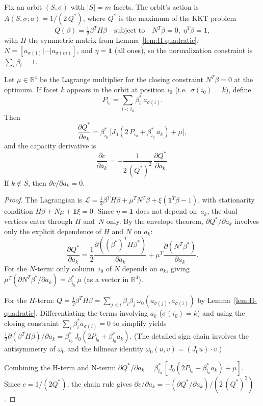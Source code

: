 \begin{unverified}
\begin{lemma}
\label{lem:cap-derivative}
Fix an orbit $(S,\sigma)$ with $|S| = m$ facets. The orbit's action is
$A(S,\sigma;a) = 1/(2\,Q^*)$, where $Q^*$ is the maximum of the KKT problem
\[
  Q(\beta) = \tfrac{1}{2}\beta^T H \beta
  \quad\text{subject to}\quad
  N^T\beta = 0,\; \eta^T\beta = 1,
\]
with $H$ the symmetric matrix from Lemma~\ref{lem:H-quadratic},
$N = [a_{\sigma(1)} | \cdots | a_{\sigma(m)}]$, and
$\eta = \mathbf{1}$ (all ones), so the normalization constraint is
$\sum_i \beta_i = 1$.

Let $\mu \in \mathbb{R}^4$ be the Lagrange multiplier for the closing
constraint $N^T\beta = 0$ at the optimum. If facet $k$ appears in the
orbit at position $i_0$ (i.e.\ $\sigma(i_0) = k$), define
\[
  P_{i_0} = \sum_{i < i_0} \beta_i^*\,a_{\sigma(i)}.
\]
Then
\[
  \frac{\partial Q^*}{\partial a_k}
  = \beta_{i_0}^*\,\bigl[J_0(2\,P_{i_0} + \beta_{i_0}^*\,a_k) + \mu\bigr],
\]
and the capacity derivative is
\[
  \frac{\partial c}{\partial a_k}
  = -\frac{1}{2\,(Q^*)^2}\,\frac{\partial Q^*}{\partial a_k}.
\]
If $k \notin S$, then $\partial c / \partial a_k = 0$.
\end{lemma}

\begin{proof}
The Lagrangian is
$\mathcal{L} = \tfrac{1}{2}\beta^T H\beta + \mu^T N^T\beta + \xi(\mathbf{1}^T\beta - 1)$,
with stationarity condition $H\beta + N\mu + \mathbf{1}\xi = 0$.
Since $\eta = \mathbf{1}$ does not depend on~$a_k$, the dual vertices enter
through $H$ and~$N$ only.
By the envelope theorem, $\partial Q^*/\partial a_k$ involves only the
explicit dependence of $H$ and $N$ on $a_k$:
\[
  \frac{\partial Q^*}{\partial a_k}
  = \frac{1}{2}\frac{\partial((\beta^*)^T H\beta^*)}{\partial a_k}
    + \mu^T\frac{\partial(N^T\beta^*)}{\partial a_k}.
\]
For the $N$-term: only column~$i_0$ of $N$ depends on $a_k$, giving
$\mu^T(\partial N^T\beta^*/\partial a_k) = \beta_{i_0}^*\,\mu$
(as a vector in $\mathbb{R}^4$).

For the $H$-term: $Q = \frac{1}{2}\beta^T H\beta
= \sum_{j < i} \beta_i \beta_j\,\omega_0(a_{\sigma(j)}, a_{\sigma(i)})$
by Lemma~\ref{lem:H-quadratic}. Differentiating the terms involving $a_k$
($\sigma(i_0) = k$) and using the closing constraint
$\sum_i \beta_i^* a_{\sigma(i)} = 0$ to simplify yields
$\frac{1}{2}\partial(\beta^T H\beta)/\partial a_k
= \beta_{i_0}^*\,J_0(2P_{i_0} + \beta_{i_0}^* a_k)$.
(The detailed sign chain involves the antisymmetry of $\omega_0$ and the
bilinear identity $\omega_0(u,v) = (J_0 u) \cdot v$.)

Combining the H-term and N-term:
$\partial Q^*/\partial a_k
= \beta_{i_0}^*\,[J_0(2P_{i_0} + \beta_{i_0}^* a_k) + \mu]$.
Since $c = 1/(2Q^*)$, the chain rule gives
$\partial c/\partial a_k = -(\partial Q^*/\partial a_k) / (2\,(Q^*)^2)$.
\end{proof}
\end{unverified}

